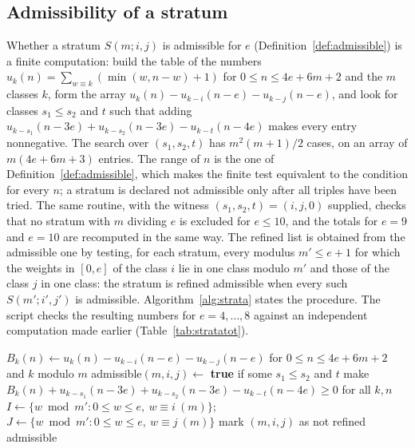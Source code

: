 \documentclass[11pt]{article}
\theoremstyle{definition}
\theoremstyle{remark}
\begin{document}
\subsection{Admissibility of a stratum}
\label{sec:stratamethods}

Whether a stratum $S(m;i,j)$ is admissible for $e$ (Definition~\ref{def:admissible}) is a finite computation: build the table of the numbers $u_k(n)=\sum_{w\equiv k}(\min(w,n-w)+1)$ for $0\le n\le4e+6m+2$ and the $m$ classes $k$, form the array $u_k(n)-u_{k-i}(n-e)-u_{k-j}(n-e)$, and look for classes $s_1\le s_2$ and $t$ such that adding $u_{k-s_1}(n-3e)+u_{k-s_2}(n-3e)-u_{k-t}(n-4e)$ makes every entry nonnegative. The search over $(s_1,s_2,t)$ has $m^2(m+1)/2$ cases, on an array of $m(4e+6m+3)$ entries. The range of $n$ is the one of Definition~\ref{def:admissible}, which makes the finite test equivalent to the condition for every $n$; a stratum is declared not admissible only after all triples have been tried. The same routine, with the witness $(s_1,s_2,t)=(i,j,0)$ supplied, checks that no stratum with $m$ dividing $e$ is excluded for $e\le10$, and the totals for $e=9$ and $e=10$ are recomputed in the same way. The refined list is obtained from the admissible one by testing, for each stratum, every modulus $m'\le e+1$ for which the weights in $[0,e]$ of the class $i$ lie in one class modulo $m'$ and those of the class $j$ in one class: the stratum is refined admissible when every such $S(m';i',j')$ is admissible. Algorithm~\ref{alg:strata} states the procedure. The script checks the resulting numbers for $e=4,\dots,8$ against an independent computation made earlier (Table~\ref{tab:stratatot}).

\begin{algorithm}[htbp]
\caption{Admissible and refined admissible strata of degree $e$. Input: $e\ge4$. Output: the admissible strata $(m,i,j)$ with $2\le m\le e+1$, $0\le i\le j<m$, and the refined admissible ones.}
\label{alg:strata}
\begin{algorithmic}[1]
  \State $B_k(n)\gets u_k(n)-u_{k-i}(n-e)-u_{k-j}(n-e)$ for $0\le n\le4e+6m+2$ and $k$ modulo $m$
  \State admissible$(m,i,j)\gets$ \textbf{true} if some $s_1\le s_2$ and $t$ make $B_k(n)+u_{k-s_1}(n-3e)+u_{k-s_2}(n-3e)-u_{k-t}(n-4e)\ge0$ for all $k,n$
\EndFor
{}
    \State $I\gets\{w\bmod m':0\le w\le e,\ w\equiv i\ (m)\}$; $J\gets\{w\bmod m':0\le w\le e,\ w\equiv j\ (m)\}$
    \State mark $(m,i,j)$ as not refined admissible\EndIf
  \EndFor
\EndFor
\end{algorithmic}
\end{algorithm}
\end{document}
